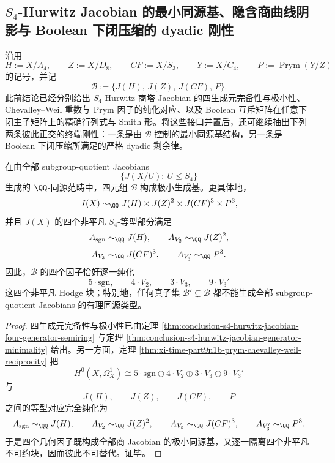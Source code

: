 \subsection{\texorpdfstring{$S_4$}{S4}-Hurwitz Jacobian 的最小同源基、隐含商曲线阴影与 Boolean 下闭压缩的 dyadic 刚性}\label{subsec:conclusion-s4-hurwitz-basis-boolean-dyadic-rigidity}
沿用
\[
H:=X/A_4,\qquad
Z:=X/D_8,\qquad
CF:=X/S_3,\qquad
Y:=X/C_4,\qquad
P:=\operatorname{Prym}(Y/Z)
\]
的记号，并记
\[
\mathcal B:=\{J(H),\,J(Z),\,J(CF),\,P\}.
\]
此前结论已经分别给出 \(S_4\)-Hurwitz 商塔 Jacobian 的四生成元完备性与极小性、Chevalley--Weil 重数与 Prym 因子的纯化对应、以及 Boolean 互斥矩阵在任意下闭主子矩阵上的精确行列式与 Smith 形。将这些接口并置后，还可继续抽出下列两条彼此正交的终端刚性：一条是由 \(\mathcal B\) 控制的最小同源基结构，另一条是 Boolean 下闭压缩所满足的严格 dyadic 剩余律。

\begin{theorem}\label{thm:conclusion-s4-hurwitz-minimal-isogeny-basis-purification}
在由全部 subgroup-quotient Jacobians
\[
\{J(X/U):\ U\le S_4\}
\]
生成的 \(\QQ\)-同源范畴中，四元组 \(\mathcal B\) 构成极小生成基。更具体地，
\[
J(X)\sim_{\QQ}J(H)\times J(Z)^2\times J(CF)^3\times P^3,
\]
并且 \(J(X)\) 的四个非平凡 \(S_4\)-等型部分满足
\[
A_{\mathrm{sgn}}\sim_{\QQ}J(H),\qquad
A_{V_2}\sim_{\QQ}J(Z)^2,
\]
\[
A_{V_3}\sim_{\QQ}J(CF)^3,\qquad
A_{V_3'}\sim_{\QQ}P^3.
\]
因此，\(\mathcal B\) 的四个因子恰好逐一纯化
\[
5\cdot \mathrm{sgn},\qquad
4\cdot V_2,\qquad
3\cdot V_3,\qquad
9\cdot V_3'
\]
这四个非平凡 Hodge 块；特别地，任何真子集 \(\mathcal B'\subsetneq \mathcal B\) 都不能生成全部 subgroup-quotient Jacobians 的有理同源类型。
\end{theorem}
\begin{proof}
四生成元完备性与极小性已由定理 \ref{thm:conclusion-s4-hurwitz-jacobian-four-generator-semiring} 与定理 \ref{thm:conclusion-s4-hurwitz-jacobian-generator-minimality} 给出。另一方面，定理 \ref{thm:xi-time-part9n1b-prym-chevalley-weil-reciprocity} 把
\[
H^0(X,\Omega_X^1)\cong
5\cdot \mathrm{sgn}\oplus 4\cdot V_2\oplus 3\cdot V_3\oplus 9\cdot V_3'
\]
与
\[
J(H),\qquad J(Z),\qquad J(CF),\qquad P
\]
之间的等型对应完全纯化为
\[
A_{\mathrm{sgn}}\sim_{\QQ}J(H),\qquad
A_{V_2}\sim_{\QQ}J(Z)^2,\qquad
A_{V_3}\sim_{\QQ}J(CF)^3,\qquad
A_{V_3'}\sim_{\QQ}P^3.
\]
于是四个几何因子既构成全部商 Jacobian 的极小同源基，又逐一隔离四个非平凡不可约块，因而彼此不可替代。证毕。
\end{proof}

